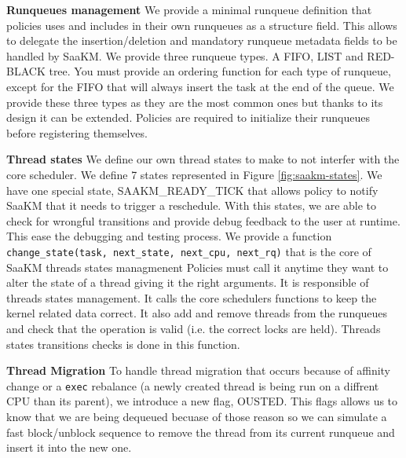 \par \textbf{Runqueues management} We provide a minimal runqueue definition that policies uses and includes in their own runqueues as a structure field. This allows to delegate the insertion/deletion and mandatory runqueue metadata fields to be handled by SaaKM. We provide three runqueue types. A FIFO, LIST and RED-BLACK tree. You must provide an ordering function for each type of runqueue, except for the FIFO that will always insert the task at the end of the queue. We provide these three types as they are the most common ones but thanks to its design it can be extended. Policies are required to initialize their runqueues before registering themselves.\newline 

\par \textbf{Thread states} We define our own thread states to make to not interfer with the core scheduler. We define 7 states represented in Figure \ref{fig:saakm-states}. We have one special state, SAAKM\_READY\_TICK that allows policy to notify SaaKM that it needs to trigger a reschedule. With this states, we are able to check for wrongful transitions and provide debug feedback to the user at runtime. This ease the debugging and testing process. We provide a function \texttt{change\_state(task, next\_state, next\_cpu, next\_rq)} that is the core of SaaKM threads states managmenent Policies must call it anytime they want to alter the state of a thread giving it the right arguments. It is responsible of threads states management. It calls the core schedulers functions to keep the kernel related data correct. It also add and remove threads from the runqueues and check that the operation is valid (i.e. the correct locks are held). Threads states transitions checks is done in this function.
\newline

\par \textbf{Thread Migration} To handle thread migration that occurs because of affinity change or a \texttt{exec} rebalance (a newly created thread is being run on a diffrent CPU than its parent), we introduce a new flag, OUSTED. This flags allows us to know that we are being dequeued becuase of those reason so we can simulate a fast block/unblock sequence to remove the thread from its current runqueue and insert it into the new one. \newline

